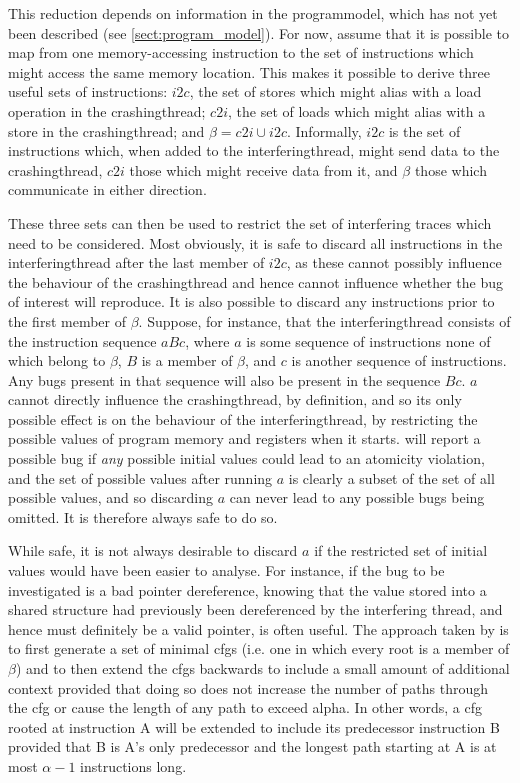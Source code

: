This reduction depends on information in the \gls{programmodel}, which
has not yet been described (see \autoref{sect:program_model}).  For
now, assume that it is possible to map from one memory-accessing
instruction to the set of instructions which might access the same
memory location.  This makes it possible to derive three useful sets
of instructions: $i2c$, the set of stores which might alias with a
load operation in the \gls{crashingthread}; $c2i$, the set of loads
which might alias with a store in the \gls{crashingthread}; and $\beta
= c2i \cup i2c$.  Informally, $i2c$ is the set of instructions which,
when added to the \gls{interferingthread}, might send data to the
\gls{crashingthread}, $c2i$ those which might receive data from it,
and $\beta$ those which communicate in either direction.

These three sets can then be used to restrict the set of interfering
traces which need to be considered.  Most obviously, it is safe to
discard all instructions in the \gls{interferingthread} after the last
member of $i2c$, as these cannot possibly influence the behaviour of
the \gls{crashingthread} and hence cannot influence whether the bug of
interest will reproduce.  It is also possible to discard any
instructions prior to the first member of $\beta$.  Suppose, for
instance, that the \gls{interferingthread} consists of the instruction
sequence $aBc$, where $a$ is some sequence of instructions none of
which belong to $\beta$, $B$ is a member of $\beta$, and $c$ is
another sequence of instructions.  Any bugs present in that sequence
will also be present in the sequence $Bc$.  $a$ cannot directly
influence the \gls{crashingthread}, by definition, and so its only
possible effect is on the behaviour of the \gls{interferingthread}, by
restricting the possible values of program memory and registers when
it starts.  {\Technique} will report a possible bug if \emph{any}
possible initial values could lead to an atomicity violation, and the
set of possible values after running $a$ is clearly a subset of the
set of all possible values, and so discarding $a$ can never lead to
any possible bugs being omitted.  It is therefore always safe to do
so.

While safe, it is not always desirable to discard $a$ if the
restricted set of initial values would have been easier to analyse.
For instance, if the bug to be investigated is a bad pointer
dereference, knowing that the value stored into a shared structure had
previously been dereferenced by the interfering thread, and hence must
definitely be a valid pointer, is often useful.  The approach taken by
{\implementation} is to first generate a set of minimal \glspl{cfg}
(i.e. one in which every root is a member of $\beta$) and to then
extend the \glspl{cfg} backwards to include a small amount of
additional context provided that doing so does not increase the number
of paths through the \gls{cfg} or cause the length of any path to
exceed \gls{alpha}.  In other words, a \gls{cfg} rooted
at instruction A will be extended to include its predecessor
instruction B provided that B is A's only predecessor and the longest
path starting at A is at most $\alpha - 1$ instructions long.


